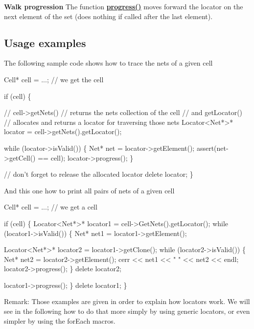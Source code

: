 {\bfseries Walk progression} The function {\bfseries \mbox{\hyperlink{classHurricane_1_1Locator_ad8d72c1625a343a50520792c96fa1ca1}{progress()}}} moves forward the locator on the next element of the set (does nothing if called after the last element).\hypertarget{classHurricane_1_1Locator_secLocatorUsageExamples}{}\subsection{Usage examples}\label{classHurricane_1_1Locator_secLocatorUsageExamples}
The following sample code shows how to trace the nets of a given cell 
\begin{DoxyCode}
Cell* cell = ...; \textcolor{comment}{// we get the cell}
 
\textcolor{keywordflow}{if} (cell) \{
 
   \textcolor{comment}{// cell->getNets()}
   \textcolor{comment}{//    returns the nets collection of the cell}
   \textcolor{comment}{// and getLocator()}
   \textcolor{comment}{//    allocates and returns a locator for traversing those nets}
   Locator<Net*>* locator = cell->getNets().getLocator();
 
   \textcolor{keywordflow}{while} (locator->isValid()) \{
      Net* net = locator->getElement();
      assert(net->getCell() == cell);
      locator->progress();
   \}
 
   \textcolor{comment}{// don't forget to release the allocated locator}
   \textcolor{keyword}{delete} locator;
\}
\end{DoxyCode}
 And this one how to print all pairs of nets of a given cell 
\begin{DoxyCode}
Cell* cell = ...; \textcolor{comment}{// we get a cell}
 
\textcolor{keywordflow}{if} (cell) \{
   Locator<Net*>* locator1 = cell->GetNets().getLocator();
   \textcolor{keywordflow}{while} (locator1->isValid()) \{
      Net* net1 = locator1->getElement();
 
      Locator<Net*>* locator2 = locator1->getClone();
      \textcolor{keywordflow}{while} (locator2->isValid()) \{
         Net* net2 = locator2->getElement();
         cerr << net1 << \textcolor{stringliteral}{" "} << net2 << endl;
         locator2->progress();
      \}
      \textcolor{keyword}{delete} locator2;
 
      locator1->progress();
   \}
   \textcolor{keyword}{delete} locator1;
\}
\end{DoxyCode}
 \begin{DoxyParagraph}{Remark\+: Those examples are given in order to explain how locators }
work. We will see in the following how to do that more simply by using generic locators, or even simpler by using the for\+Each macros. 
\end{DoxyParagraph}


